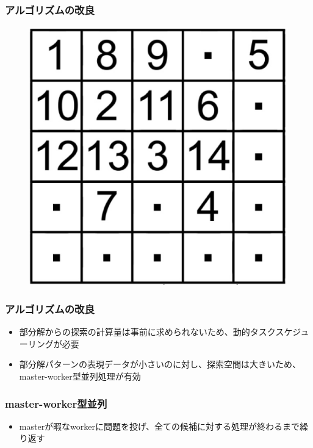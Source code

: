 \documentclass[dvipdfmx,20pt,notheorems,t]{beamer}
\begin{document}
\begin{frame}\frametitle{アルゴリズムの改良}
\begin{figure}[htb]
\centering
\includegraphics[height=0.7\textheight]{order.eps}
\end{figure}
\end{frame}

\begin{frame}\frametitle{アルゴリズムの改良}
\begin{itemize}
\item 部分解からの探索の計算量は事前に求められないため、動的タスクスケジューリングが必要
\item 部分解パターンの表現データが小さいのに対し、探索空間は大きいため、master-worker型並列処理が有効
\end{itemize}
\end{frame}

\begin{frame}\frametitle{master-worker型並列}
\begin{itemize}
\item masterが暇なworkerに問題を投げ、全ての候補に対する処理が終わるまで繰り返す
\end{itemize}
\end{frame}
\end{document}
